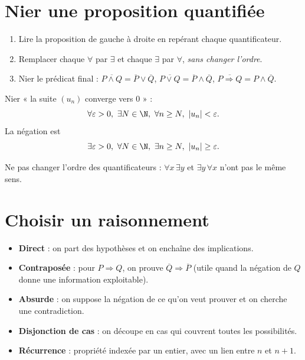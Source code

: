
\section{Nier une proposition quantifiée}

\begin{methode}
\begin{enumerate}[label=\textbf{Étape \arabic*.}]
  \item Lire la proposition de gauche à droite en repérant chaque quantificateur.
  \item Remplacer chaque $\forall$ par $\exists$ et chaque $\exists$ par $\forall$, \emph{sans changer l'ordre}.
  \item Nier le prédicat final : $\overline{P\wedge Q}=\overline P\vee\overline Q$, $\overline{P\vee Q}=\overline P\wedge\overline Q$, $\overline{P\Rightarrow Q}=P\wedge\overline Q$.
\end{enumerate}
\end{methode}

\begin{exemple}
Nier « la suite $(u_n)$ converge vers $0$ » :
\[
  \forall\varepsilon>0,\ \exists N\in\N,\ \forall n\ge N,\ |u_n|<\varepsilon .
\]
La négation est
\[
  \exists\varepsilon>0,\ \forall N\in\N,\ \exists n\ge N,\ |u_n|\ge\varepsilon .
\]
\end{exemple}

\begin{attention}
Ne pas changer l'ordre des quantificateurs : $\forall x\,\exists y$ et $\exists y\,\forall x$ n'ont pas le même sens.
\end{attention}

\section{Choisir un raisonnement}

\begin{methode}
\begin{itemize}
  \item \textbf{Direct} : on part des hypothèses et on enchaîne des implications.
  \item \textbf{Contraposée} : pour $P\Rightarrow Q$, on prouve $\overline Q\Rightarrow\overline P$ (utile quand la négation de $Q$ donne une information exploitable).
  \item \textbf{Absurde} : on suppose la négation de ce qu'on veut prouver et on cherche une contradiction.
  \item \textbf{Disjonction de cas} : on découpe en cas qui couvrent toutes les possibilités.
  \item \textbf{Récurrence} : propriété indexée par un entier, avec un lien entre $n$ et $n+1$.
\end{itemize}
\end{methode}

